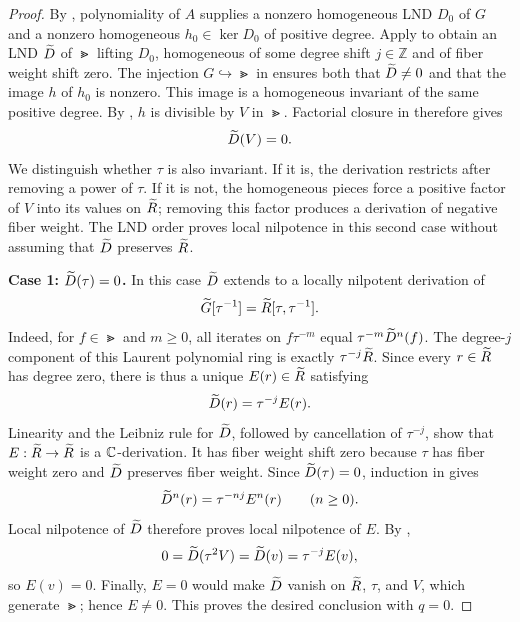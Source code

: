 \begin{proof}
By , polynomiality of $A$ supplies a nonzero
homogeneous LND $D_0$ of $G$ and a nonzero homogeneous
$h_0\in\ker D_0$ of positive degree.  Apply
 to obtain an LND $\widetilde D$ of $\Gt$ lifting
$D_0$, homogeneous of some degree shift $j\in\mathbb Z$ and of fiber
weight shift zero.  The injection $G\hookrightarrow\Gt$ in
 ensures both that $\widetilde D\ne0$ and that the
image $h$ of $h_0$ is nonzero.  This image is a homogeneous invariant
of the same positive degree.  By , $h$ is divisible
by $V$ in $\Gt$.  Factorial closure in  therefore
gives
\begin{equation}\label{red:V-invariant}
  \widetilde D(V)=0.
\end{equation}
We distinguish whether $\tau$ is also invariant. If it is, the
derivation restricts after removing a power of $\tau$. If it is not,
the homogeneous pieces force a positive factor of $V$ into its values
on $\widetilde R$; removing this factor produces a derivation of negative
fiber weight. The LND order proves local nilpotence in this second
case without assuming that $\widetilde D$ preserves $\widetilde R$.

\medskip
\noindent\textbf{Case 1: $\widetilde D(\tau)=0$.}
In this case $\widetilde D$ extends to a locally nilpotent derivation of
\[
  \widetilde G[\tau^{-1}]=\widetilde R[\tau,\tau^{-1}].
\]
Indeed, for $f\in\Gt$ and $m\ge0$, all iterates on
$f\tau^{-m}$ equal $\tau^{-m}\widetilde D^n(f)$.  The degree-$j$ component of
this Laurent polynomial ring is exactly $\tau^{-j}\widetilde R$.
Since every $r\in\widetilde R$ has degree zero, there is thus a unique
$E(r)\in\widetilde R$ satisfying
\begin{equation}\label{red:fixed-tau}
  \widetilde D(r)=\tau^{-j}E(r).
\end{equation}
Linearity and the Leibniz rule for $\widetilde D$, followed by cancellation of
$\tau^{-j}$, show that $E:\widetilde R\to\widetilde R$ is a $\mathbb C$-derivation.
It has fiber weight shift zero because $\tau$ has fiber weight zero
and $\widetilde D$ preserves fiber weight.  Since $\widetilde D(\tau)=0$, induction in
 gives
\[
  \widetilde D^n(r)=\tau^{-nj}E^n(r)\qquad(n\ge0).
\]
Local nilpotence of $\widetilde D$ therefore proves local nilpotence of $E$.
By ,
\[
  0=\widetilde D(\tau^2V)=\widetilde D(v)=\tau^{-j}E(v),
\]
so $E(v)=0$.  Finally, $E=0$ would make $\widetilde D$ vanish on $\widetilde R$, $\tau$,
and $V$, which generate $\Gt$; hence $E\ne0$.  This proves the desired
conclusion with $q=0$.


\end{proof}
